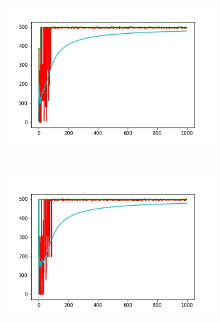 \begin{figure}
\begin{subfigure}[b]{0.38\textwidth}
        \label{fig:gull}
    \end{subfigure}
    ~ %
    \begin{subfigure}[b]{0.38\textwidth}
        \includegraphics[width=\textwidth]{grafi6.jpg}
        \label{fig:tiger}
    \end{subfigure}
    ~ %
    \begin{subfigure}[b]{0.38\textwidth}
        \includegraphics[width=\textwidth]{grafi7.jpg}
        \label{fig:mouse}
    \end{subfigure}
    \begin{subfigure}[b]{0.38\textwidth}

\end{subfigure}
\end{figure}
